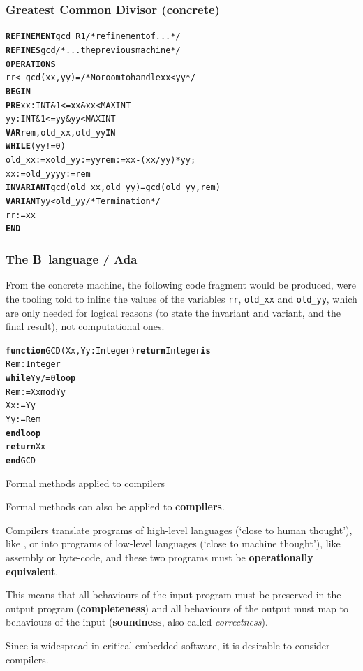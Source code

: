\documentclass[compress,dvipdfmx]{beamer}
\begin{document}
\begin{frame}[fragile]
  \frametitle{Greatest Common Divisor (concrete)}

\begin{alltt}
\small
\textbf{REFINEMENT} gcd_R1 /* refinement of ...        */
\textbf{REFINES} gcd       /* ... the previous machine */
\textbf{OPERATIONS}
 rr <-- gcd (xx,yy) = /* No room to handle xx < yy */
   \textbf{BEGIN}
     \textbf{PRE} xx : INT \& 1 <= xx \& xx < MAXINT
         yy : INT \& 1 <= yy \& yy < MAXINT
     \textbf{VAR} rem, old_xx, old_yy \textbf{IN}
     \textbf{WHILE} (yy != 0)
       old_xx := xold_yy := yyrem := xx-(xx/yy)*yy;
       xx := old_yyyy := rem
     \textbf{INVARIANT} gcd (old_xx, old_yy) = gcd (old_yy, rem)
     \textbf{VARIANT} yy < old_yy /* Termination */
     rr := xx
   \textbf{END}
\end{alltt}

\end{frame}

\begin{frame}[fragile]
  \frametitle{The B~language / Ada}

  From the concrete machine, the following \Ada code fragment would be
  produced, were the tooling told to inline the values of the
  variables \texttt{\small rr}, \texttt{\small old\_xx} and
  \texttt{\small old\_yy}, which are only needed for logical reasons
  (to state the invariant and variant, and the final result), not
  computational ones.
\begin{alltt}
\small
\textbf{function} GCD (Xx, Yy : Integer) \textbf{return} Integer \textbf{is}
  Rem : Integer
  \textbf{while} Yy /= 0 \textbf{loop}
    Rem := Xx \textbf{mod} Yy
    Xx := Yy
    Yy := Rem
  \textbf{end loop}
  \textbf{return} Xx
\textbf{end} GCD
\end{alltt}

\end{frame}


\begin{frame}{Formal methods applied to compilers}

  Formal methods can also be applied to \textbf{compilers}.

  \bigskip

  Compilers translate programs of high\hyp{}level languages (`close to
  human thought'), like \Clang, \Ada or \OCaml into programs of
  low\hyp{}level languages (`close to machine thought'), like assembly
  or byte\hyp{}code, and these two programs must be
  \textbf{operationally equivalent}.

  \bigskip

  This means that all behaviours of the input program must be
  preserved in the output program (\textbf{completeness}) and all
  behaviours of the output must map to behaviours of the input
  (\textbf{soundness}, also called \emph{correctness}).

  \bigskip

  Since \Clang is widespread in critical embedded software, it is
  desirable to consider \Clang compilers.

\end{frame}
\end{document}
